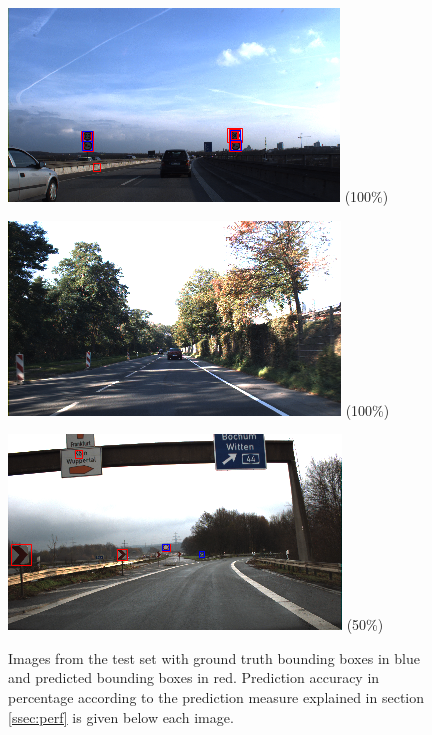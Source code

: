 \documentclass[12pt,a4paper,bibliography=totocnumbered,listof=totocnumbered]{scrartcl}
\begin{document}
\begin{figure}[H]
\begin{minipage}{0.3\textwidth}
\centering
\includegraphics[width=\linewidth]{test144_wb_predboxes2.png}
\small{(100\%)}
\end{minipage}
\hfill
\begin{minipage}{0.3\textwidth}
\centering
\includegraphics[width=\linewidth]{test200_wb_predboxes2.png}
\small{(100\%)}
\end{minipage}
\hfill
\begin{minipage}{0.3\textwidth}
\centering
\includegraphics[width=\linewidth]{test100_wb_predboxes2.png}
\small{(50\%)}
\end{minipage}
\caption{Images from the test set with ground truth bounding boxes in blue and predicted bounding boxes in red. Prediction accuracy in percentage according to the prediction measure explained in section \ref{ssec:perf} is given below each image.}
\label{fig:test_img_bbox}
\end{figure}
\end{document}
